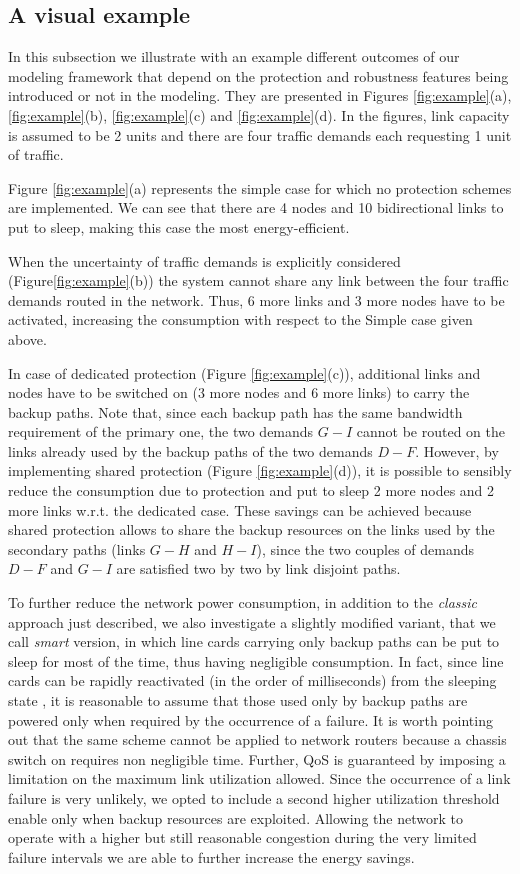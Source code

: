 \documentclass[final,5p,times,twocolumn]{elsarticle}
\begin{document}
\subsection{A visual example}
In this subsection we illustrate with an example different outcomes of our modeling framework
that depend on the protection and robustness features being introduced or not in the modeling.
They are presented in
Figures \ref{fig:example}(a), \ref{fig:example}(b), \ref{fig:example}(c) and \ref{fig:example}(d).
In the figures, link capacity is assumed to be 2 units and there are four traffic demands each requesting 1 unit of traffic.

Figure \ref{fig:example}(a) represents the simple case for which no protection schemes are implemented.
We can see that
there are 4 nodes and 10 bidirectional links to put to sleep, making this case the most energy-efficient.

When the uncertainty of traffic demands is explicitly considered  (Figure\ref{fig:example}(b)) the system cannot share any link between the four traffic demands routed in the network. Thus, 6 more links and 3 more nodes have to be activated, increasing the consumption with respect to the Simple case given above.

In case of dedicated protection (Figure \ref{fig:example}(c)), additional links and nodes have to be switched on (3 more nodes and 6 more links) to carry the backup paths. 
Note that, since each backup path has the same bandwidth requirement of the primary one, the two demands $G-I$ cannot be routed on the links already used by the backup paths of the two demands $D-F$. However, by implementing shared protection (Figure \ref{fig:example}(d)), it is possible to sensibly reduce the consumption due to protection and put to sleep 2 more nodes and 2 more links w.r.t. the dedicated case. These savings can be achieved because shared protection allows to share the backup resources on the links used by the secondary paths (links $G-H$ and $H-I$), since the two couples of demands $D-F$ and $G-I$ are satisfied two by two by link disjoint paths.

To further reduce the network power consumption, in addition to the \textit{classic} approach just described, we also investigate  a slightly modified variant, that we call \textit{smart} version, in which line cards carrying only backup paths can be put to sleep for most of the time, thus having negligible consumption. In fact, since line cards can be rapidly reactivated (in the order of milliseconds) from the sleeping state \cite{hays07}, it is reasonable to assume that those used only by  backup paths are powered only when required by the occurrence of a failure. 
It is worth pointing out that the same scheme cannot be applied to network routers because a chassis switch on requires non negligible time. Further, QoS is guaranteed by imposing a limitation on the maximum link utilization allowed. Since the occurrence of a link failure is very unlikely, we opted to include a second higher utilization threshold enable only when backup resources are exploited. Allowing the network to operate with a higher but still reasonable congestion during the very limited failure intervals we are able to further increase the energy savings.
\end{document}
